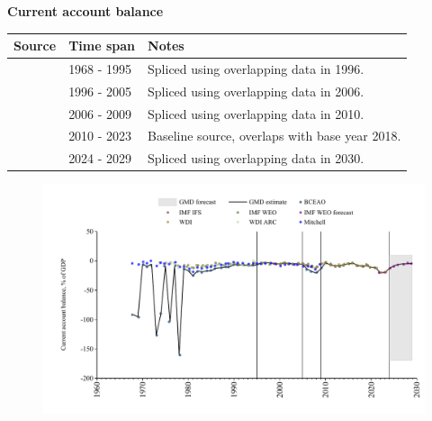 \documentclass[12pt,a4paper,landscape]{article}
\begin{document}
\begin{adjustbox}{max totalsize={\paperwidth}{\paperheight},center}
\begin{minipage}[t][\textheight][t]{\textwidth}
\vspace*{0.5cm}
{}
\begin{center}
{\Large\bfseries Current account balance}
\end{center}
\vspace{0.5cm}
\begin{table}[H]
\centering
\small
\begin{tabular}{|l|l|l|}
\hline
\textbf{Source} & \textbf{Time span} & \textbf{Notes} \\
\hline
\rowcolor{white}\cite{BCEAO}& 1968 - 1995 &Spliced using overlapping data in 1996. \\
\rowcolor{lightgray}\cite{WDI}& 1996 - 2005 &Spliced using overlapping data in 2006. \\
\rowcolor{white}\cite{BCEAO}& 2006 - 2009 &Spliced using overlapping data in 2010. \\
\rowcolor{lightgray}\cite{WDI}& 2010 - 2023 &Baseline source, overlaps with base year 2018. \\
\rowcolor{white}\cite{IMF_WEO_forecast}& 2024 - 2029 &Spliced using overlapping data in 2030. \\
\hline
\end{tabular}
\end{table}
\begin{figure}[H]
\centering
\includegraphics[width=\textwidth,height=0.6\textheight,keepaspectratio]{graphs/SEN_CA_GDP.pdf}
\end{figure}
\end{minipage}
\end{adjustbox}
\end{document}
